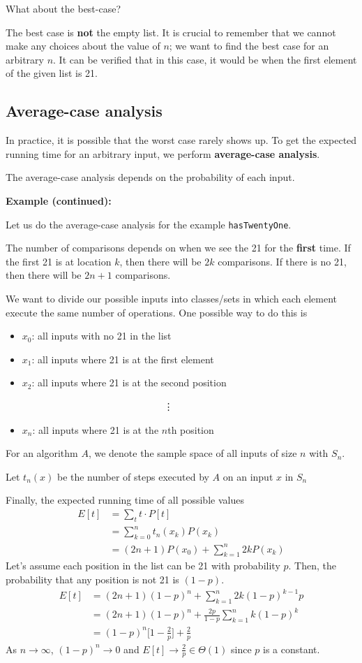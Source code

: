\documentclass[11pt]{article}
\begin{document}
What about the best-case?

The best case is \textbf{not} the empty list. It is crucial to remember that we cannot make any choices about the value of $n$; we want to find the best case for an arbitrary $n$. It can be verified that in this case, it would be when the first element of the given list is 21. 

\subsection{Average-case analysis}
In practice, it is possible that the worst case rarely shows up. To get the expected running time for an arbitrary input, we perform \textbf{average-case analysis}. 

The average-case analysis depends on the probability of each input. 

\textbf{Example (continued): }

Let us do the average-case analysis for the example \texttt{hasTwentyOne}. 

The number of comparisons depends on when we see the 21 for the \textbf{first} time. If the first 21 is at location $k$, then there will be $2k$ comparisons. If there is no 21, then there will be $2n+1$ comparisons. 

We want to divide our possible inputs into classes/sets in which each element execute the same number of operations. One possible way to do this is 
\begin{itemize}
    \item $x_0$: all inputs with no 21 in the list
    \item $x_1$: all inputs where 21 is at the first element
    \item $x_2$: all inputs where 21 is at the second position 
    
    ~~~~~~~~~~~~~~~~~~~~~~~~~~~~~\vdots 
    \item $x_n$: all inputs where 21 is at the $n$th position 
\end{itemize}
For an algorithm $A$, we denote the sample space of all inputs of size $n$ with $S_n$. 

Let $t_n(x)$ be the number of steps executed by $A$ on an input $x$ in $S_n$

 Finally, the expected running time of all possible values 
\begin{align*}
    E[t] &= \sum_{t} t \cdot P[t] \\
    &= \sum_{k=0}^n t_n(x_k) P(x_k) \\
    &= (2n+1) P(x_0) + \sum_{k=1}^n 2k P(x_k)
\end{align*}
Let's assume each position in the list can be 21 with probability $p$. Then, the probability that any position is not 21 is $(1-p)$. 
\begin{align*}
    E[t] &= (2n+1)(1-p)^n + \sum_{k=1}^n 2k (1-p)^{k-1} p \\
    &= (2n+1)(1-p)^n + \frac{2p}{1-p} \sum_{k=1}^n k(1-p)^k \\
    &= (1-p)^n \bigg[1 - \frac{2}{p}\bigg]+ \frac{2}{p} \tag{use arithmetic-geometric series}
\end{align*}
As $n \to \infty$, $(1-p)^n \to 0$ and $E[t] \to \frac{2}{p} \in \Theta(1)$ since $p$ is a constant. \bigskip 
\end{document}
